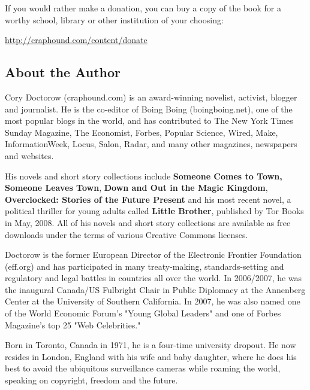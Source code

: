 If you would rather make a donation, you can buy a copy of the book
for a worthy school, library or other institution of your
choosing:

\href{http://craphound.com/content/donate}{http://craphound.com/content/donate}

\subsection{About the Author}

Cory Doctorow (craphound.com) is an award-winning novelist,
activist, blogger and journalist. He is the co-editor of Boing
Boing (boingboing.net), one of the most popular blogs in the world,
and has contributed to The New York Times Sunday Magazine, The
Economist, Forbes, Popular Science, Wired, Make, InformationWeek,
Locus, Salon, Radar, and many other magazines, newspapers and
websites.

His novels and short story collections include
\textbf{Someone Comes to Town, Someone Leaves Town},
\textbf{Down and Out in the Magic Kingdom},
\textbf{Overclocked: Stories of the Future Present} and his most
recent novel, a political thriller for young adults called
\textbf{Little Brother}, published by Tor Books in May, 2008. All
of his novels and short story collections are available as free
downloads under the terms of various Creative Commons licenses.

Doctorow is the former European Director of the Electronic Frontier
Foundation (eff.org) and has participated in many treaty-making,
standards-setting and regulatory and legal battles in countries all
over the world. In 2006/2007, he was the inaugural Canada/US
Fulbright Chair in Public Diplomacy at the Annenberg Center at the
University of Southern California. In 2007, he was also named one
of the World Economic Forum's "Young Global Leaders" and one of
Forbes Magazine's top 25 "Web Celebrities."

Born in Toronto, Canada in 1971, he is a four-time university
dropout. He now resides in London, England with his wife and baby
daughter, where he does his best to avoid the ubiquitous
surveillance cameras while roaming the world, speaking on
copyright, freedom and the future.

